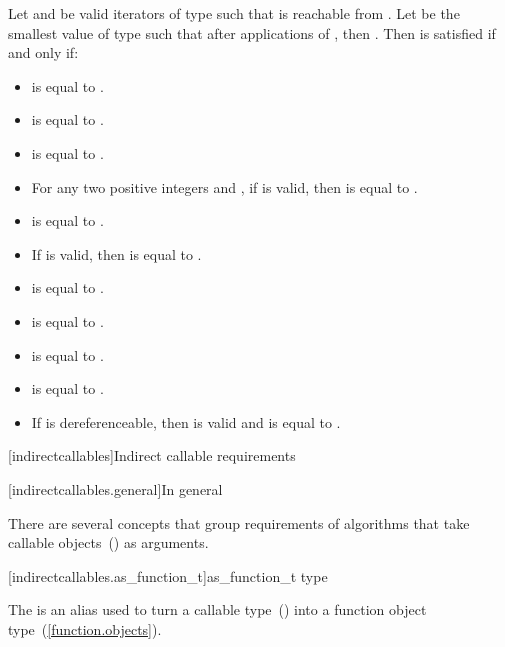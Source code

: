 \begin{addedblock}
\pnum
Let  and  be valid iterators of type  such that  is reachable
from . Let  be the smallest value of type
 such that after
 applications of , then . Then
 is satisfied if and only if:

\begin{itemize}
\item {} is equal to .
\item {} is equal to .
\item {} is equal to .
\item For any two positive integers  and , if  is valid, then
 is equal to .
\item {} is equal to .
\item If  is valid, then  is equal to .
\item {} is equal to .
\item {} is equal to .
\item {} is equal to .
\item {} is equal to .
\item If  is dereferenceable, then  is valid and is equal to .
\end{itemize}

[indirectcallables]{Indirect callable requirements}

[indirectcallables.general]{In general}

\pnum
There are several concepts that group requirements of algorithms that take callable
objects~() as arguments.


{\color{oldclr}
[indirectcallables.as_function_t]{as_function_t type}

\pnum
The  is an alias used to turn a
callable type~() into a function object type~(\ref{function.objects}).

}
\end{addedblock}

